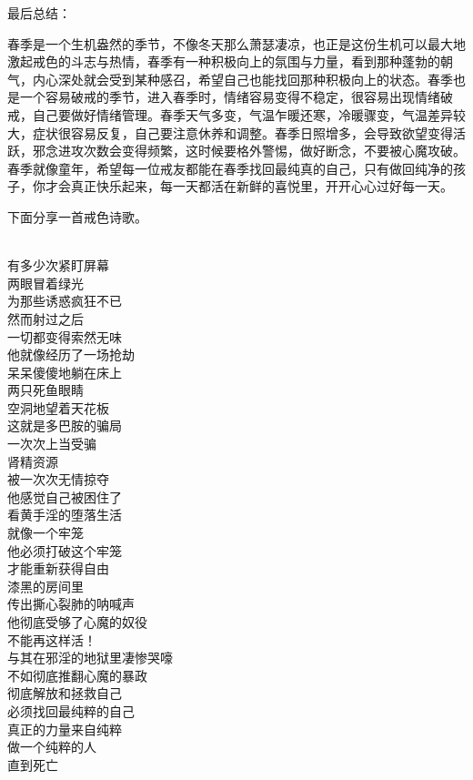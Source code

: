 最后总结：

春季是一个生机盎然的季节，不像冬天那么萧瑟凄凉，也正是这份生机可以最大地激起戒色的斗志与热情，春季有一种积极向上的氛围与力量，看到那种蓬勃的朝气，内心深处就会受到某种感召，希望自己也能找回那种积极向上的状态。春季也是一个容易破戒的季节，进入春季时，情绪容易变得不稳定，很容易出现情绪破戒，自己要做好情绪管理。春季天气多变，气温乍暖还寒，冷暖骤变，气温差异较大，症状很容易反复，自己要注意休养和调整。春季日照增多，会导致欲望变得活跃，邪念进攻次数会变得频繁，这时候要格外警惕，做好断念，不要被心魔攻破。春季就像童年，希望每一位戒友都能在春季找回最纯真的自己，只有做回纯净的孩子，你才会真正快乐起来，每一天都活在新鲜的喜悦里，开开心心过好每一天。

下面分享一首戒色诗歌。

\begin{poem}[找回最纯粹的自己]
    \begin{multicols}{3}
        \centering~\\
        有多少次紧盯屏幕 \\ 两眼冒着绿光 \\ 为那些诱惑疯狂不已 \\ 然而射过之后 \\ 一切都变得索然无味 \\ 他就像经历了一场抢劫 \\ 呆呆傻傻地躺在床上 \\ 两只死鱼眼睛 \\ 空洞地望着天花板 \\ 这就是多巴胺的骗局 \\ 一次次上当受骗 \\ 肾精资源 \\ 被一次次无情掠夺 \\ 他感觉自己被困住了 \\ 看黄手淫的堕落生活 \\ 就像一个牢笼 \\ 他必须打破这个牢笼 \\ 才能重新获得自由 \\ 漆黑的房间里 \\ 传出撕心裂肺的呐喊声 \\ 他彻底受够了心魔的奴役 \\ 不能再这样活！ \\ 与其在邪淫的地狱里凄惨哭嚎 \\ 不如彻底推翻心魔的暴政 \\ 彻底解放和拯救自己 \\ 必须找回最纯粹的自己 \\ 真正的力量来自纯粹 \\ 做一个纯粹的人 \\ 直到死亡
    \end{multicols}
\end{poem}

